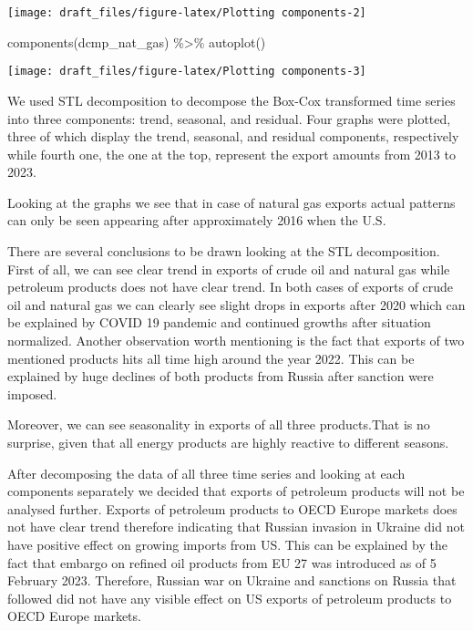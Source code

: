 \documentclass[
]{article}
\newenvironment{Shaded}{\begin{snugshade}}{\end{snugshade}}
\newcommand{\FunctionTok}[1]{\textcolor[rgb]{0.00,0.00,0.00}{#1}}
\newcommand{\NormalTok}[1]{#1}
\newcommand{\SpecialCharTok}[1]{\textcolor[rgb]{0.00,0.00,0.00}{#1}}
\begin{document}
\begin{center}\texttt{[image: draft\_files/figure-latex/Plotting components-2]} \end{center}

\begin{Shaded}
\begin{Highlighting}[]
\FunctionTok{components}\NormalTok{(dcmp\_nat\_gas) }\SpecialCharTok{\%\textgreater{}\%} \FunctionTok{autoplot}\NormalTok{()}
\end{Highlighting}
\end{Shaded}

\begin{center}\texttt{[image: draft\_files/figure-latex/Plotting components-3]} \end{center}

We used STL decomposition to decompose the Box-Cox transformed time
series into three components: trend, seasonal, and residual. Four graphs
were plotted, three of which display the trend, seasonal, and residual
components, respectively while fourth one, the one at the top, represent
the export amounts from 2013 to 2023.

Looking at the graphs we see that in case of natural gas exports actual
patterns can only be seen appearing after approximately 2016 when the
U.S.

There are several conclusions to be drawn looking at the STL
decomposition. First of all, we can see clear trend in exports of crude
oil and natural gas while petroleum products does not have clear trend.
In both cases of exports of crude oil and natural gas we can clearly see
slight drops in exports after 2020 which can be explained by COVID 19
pandemic and continued growths after situation normalized. Another
observation worth mentioning is the fact that exports of two mentioned
products hits all time high around the year 2022. This can be explained
by huge declines of both products from Russia after sanction were
imposed.

Moreover, we can see seasonality in exports of all three products.That
is no surprise, given that all energy products are highly reactive to
different seasons.

After decomposing the data of all three time series and looking at each
components separately we decided that exports of petroleum products will
not be analysed further. Exports of petroleum products to OECD Europe
markets does not have clear trend therefore indicating that Russian
invasion in Ukraine did not have positive effect on growing imports from
US. This can be explained by the fact that embargo on refined oil
products from EU 27 was introduced as of 5 February 2023. Therefore,
Russian war on Ukraine and sanctions on Russia that followed did not
have any visible effect on US exports of petroleum products to OECD
Europe markets.
\end{document}
